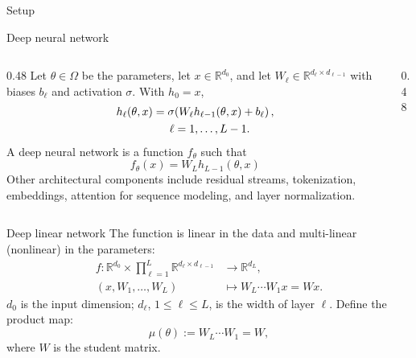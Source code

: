 \documentclass[aspectratio=169,11pt]{beamer}
\newcommand{\sectionframe}[1]{%
  \begin{frame}[plain]
    \centering
    \vfill
    {\Huge #1}
    \vfill
  \end{frame}
}
\begin{document}
\sectionframe{Setup}
\begin{frame}{Deep neural network}
\small
\begin{columns}[T,onlytextwidth]
\begin{column}{0.48\textwidth}
Let $\theta\in \Omega$ be the parameters, let $x\in\mathbb{R}^{d_0}$, and let $W_\ell\in\mathbb{R}^{d_\ell \times d_{\ell-1}}$ with biases $b_\ell$ and activation $\sigma$. With $h_0=x$,
\[
\begin{aligned}
h_\ell(\theta,x)
&=
\sigma\!\left(W_\ell h_{\ell-1}(\theta,x)+b_\ell\right), \\
&\hspace{1.5em}\ell=1,\ldots,L-1.
\end{aligned}
\]
A deep neural network is a function $f_\theta$ such that
\[
f_\theta(x) = W_Lh_{L-1}(\theta,x)
\]
Other architectural components include residual streams, tokenization, embeddings, attention for sequence modeling, and layer normalization.
\end{column}
\begin{column}{0.48\textwidth}
\centering
\vspace{0.2cm}
\resizebox{\linewidth}{!}{}
\end{column}
\end{columns}
\end{frame}
\begin{frame}{Deep linear network}
The function is linear in the data and multi-linear (nonlinear) in the parameters:
  \[
    \begin{aligned}
      f\colon \mathbb{R}^{d_0} \times
      \prod_{\ell=1}^{L}\mathbb{R}^{d_\ell \times d_{\ell-1}}
      &\longrightarrow \mathbb{R}^{d_L}, \\
      (x,W_1,\ldots,W_L)
      &\longmapsto W_L\cdots W_1x = Wx.
    \end{aligned}
  \]
$d_0$ is the input dimension; $d_\ell$, $1\leq \ell \leq L$, is the width of layer $\ell$.
Define the product map:
\[
\mu(\theta) := W_L\cdots W_1 = W,
\]
where $W$ is the student matrix.
\end{frame}
\end{document}
